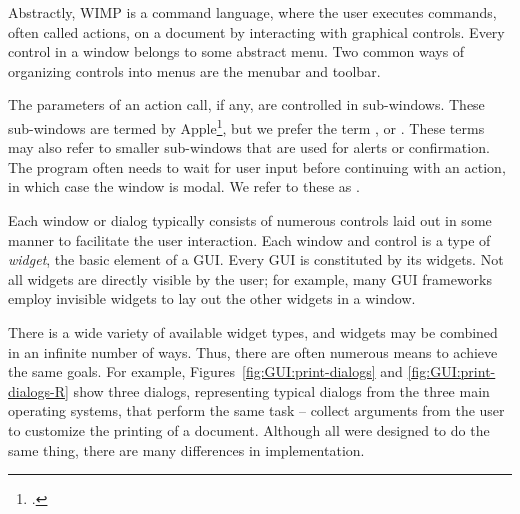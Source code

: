 Abstractly, WIMP is a command language, where the user executes
commands, often called actions, on a document by interacting with
graphical controls. Every control in a window belongs to some abstract
menu. Two common ways of organizing controls into menus are the
menubar and toolbar.

The parameters of an action call, if any, are controlled in
sub-windows. These sub-windows are termed 
by Apple\footcite{APPLE:HIG}, but we prefer the term ,
or . These terms may also refer to smaller
sub-windows that are used for alerts or confirmation. The program
often needs to wait for user input before continuing with an action,
in which case the window is modal. We refer to these as .

Each window or dialog typically consists of numerous controls laid out
in some manner to facilitate the user interaction. Each window and
control is a type of \textit{widget}, the basic element of a
GUI. Every GUI is constituted by its widgets. Not all widgets are
directly visible by the user; for example, many GUI frameworks employ
invisible widgets to lay out the other widgets in a window.

There is a wide variety of available widget types, and widgets may be
combined in an infinite number of ways. Thus, there are often numerous
means to achieve the same goals. For example,
Figures~\ref{fig:GUI:print-dialogs} and \ref{fig:GUI:print-dialogs-R}
show three dialogs, representing typical dialogs from the three main
operating systems, that perform the same task -- collect arguments
from the user to customize the printing of a document. Although all
were designed to do the same thing, there are many differences in
implementation.



